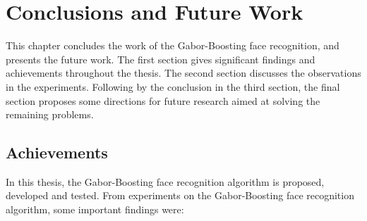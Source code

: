 \chapter{Conclusions and Future Work}
\label{ch:conc}
This chapter concludes the work of the Gabor-Boosting face recognition, and presents the future work. The first section gives significant findings and achievements throughout the thesis. The second section discusses the observations in the experiments. Following by the conclusion in the third section, the final section proposes some directions for future research aimed at solving the remaining problems.

\section{Achievements}
In this thesis, the Gabor-Boosting face recognition algorithm is proposed, developed and tested. From experiments on the Gabor-Boosting face recognition algorithm, some important findings were:
